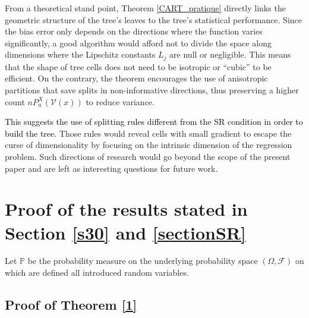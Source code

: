 \documentclass[paper=a4, fontsize=11pt]{scrartcl}
\newcommand{\PP}{\mathbb{P}}
\newcommand{\rev}[1]{\textcolor{black}{#1}}
\begin{document}
    From a theoretical stand point, Theorem \ref{CART_pratique} directly links the geometric structure of the tree's leaves to the tree's statistical performance. %
Since the bias error only depends on the directions where the function varies significantly, a good algorithm would afford not to divide the space along dimensions where the Lipschitz constants $L_j$ are null or negligible. This means that the shape of tree cells does not need to be isotropic or ``cubic'' to be efficient. On the contrary, the theorem encourages the use of anisotropic partitions that save splits in non-informative directions, thus preserving a higher count $n P_n^X(\mathcal{V}(x))$ to reduce variance. 

\rev{This suggests the use of splitting rules different from the SR condition in order to build the tree.}
Those rules would reveal cells with small gradient to escape the curse of dimensionality by focusing on the intrinsic dimension of the regression problem. Such directions of research would go beyond the scope of the present paper and are left as interesting questions for future work.




\newpage




 

\newpage
\appendix

\section{Proof of the results stated in Section \ref{s30} and \ref{sectionSR}}

Let $\PP$ be the probability measure on the underlying probability space $(\Omega, \mathcal F)$ on which are defined all introduced random variables.

\subsection*{Proof of Theorem \ref{1}}
\end{document}
